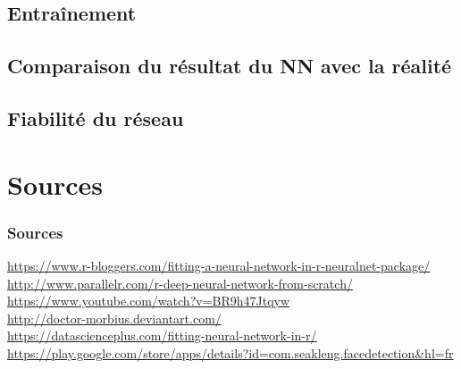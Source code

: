 \documentclass[compress]{beamer}
\begin{document}
		\subsection{Entraînement}
		\subsection{Comparaison du résultat du NN avec la réalité}
		\subsection{Fiabilité du réseau}

\section*{Sources}
\begin{frame}
\frametitle{Sources}
	\url{https://www.r-bloggers.com/fitting-a-neural-network-in-r-neuralnet-package/}\\
	\url{http://www.parallelr.com/r-deep-neural-network-from-scratch/}\\
	\url{https://www.youtube.com/watch?v=BR9h47Jtqyw}\\
	\url{http://doctor-morbius.deviantart.com/}\\
	\url{https://datascienceplus.com/fitting-neural-network-in-r/}%
	\url{https://play.google.com/store/apps/details?id=com.seakleng.facedetection&hl=fr}
\end{frame}
\end{document}
